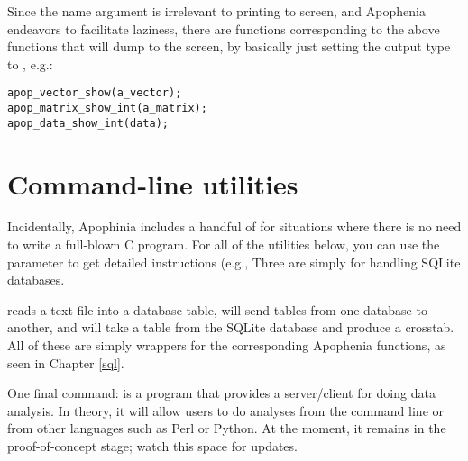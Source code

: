 Since the name argument is irrelevant to printing to screen, and
Apophenia endeavors to facilitate laziness, there are functions
corresponding to the above  functions that will
dump to the screen, by basically just setting the output type to , e.g.:
 
 
 
\begin{lstlisting}
apop_vector_show(a_vector);
apop_matrix_show_int(a_matrix);
apop_data_show_int(data);
\end{lstlisting}

\section{Command-line utilities}
Incidentally, Apophinia includes a handful of  for
situations where there is no need to write a full-blown C program. For
all of the utilities below, you can use the  parameter to
get detailed instructions (e.g., 
Three are simply for handling SQLite databases.

 reads a text file into a database table,
 will send tables from one database to
another, and
 will take a table from the SQLite
database and produce a crosstab. All of these are simply wrappers for
the corresponding Apophenia functions, as seen in Chapter \ref{sql}.

One final command:  is a program that provides a
server/client for doing data analysis. In theory, it will allow users to
do analyses from the command line or from other languages such as Perl
or Python. At the moment, it remains in the proof-of-concept stage;
watch this space for updates.

